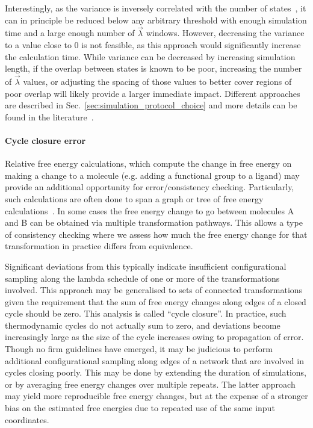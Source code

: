 \documentclass[9pt,bestpractices]{livecoms}
\begin{document}
Interestingly, as the variance is inversely correlated with the number of states~\cite{klimovich2015guidelines}, it can in principle be reduced below any arbitrary threshold with enough simulation time and a large enough number of $\vec{\lambda}$ windows. However, decreasing the variance to a value close to 0 is not feasible, as this approach would significantly increase the calculation time. While variance can be decreased by increasing simulation length, if the overlap between states is known to be poor, increasing the number of $\vec{\lambda}$ values, or adjusting the spacing of those values to better cover regions of poor overlap will likely provide a larger immediate impact. Different approaches are described in Sec.~\ref{sec:simulation_protocol_choice} and more details can be found in the literature~\cite{dakka2018concurrent, hahn2019alchemical}.

\paragraph{Cycle closure error}
Relative free energy calculations, which compute the change in free energy on making a change to a molecule (e.g. adding a functional group to a ligand) may provide an additional opportunity for error/consistency checking. Particularly, such calculations are often done to span a graph or tree of free energy calculations~\cite{xu2019optimal,wang2013modeling,liu2013lead}. In some cases the free energy change to go between molecules A and B can be obtained via multiple transformation pathways. This allows a type of consistency checking where we assess how much the free energy change for that transformation in practice differs from equivalence. 

Significant deviations from this typically indicate insufficient configurational sampling along the lambda schedule of one or more of the transformations involved. This approach may be generalised to sets of connected transformations given the requirement that the sum of free energy changes along edges of a closed cycle should be zero. This analysis is called ``cycle closure''. In practice, such thermodynamic cycles do not actually sum to zero, and deviations become increasingly large as the size of the cycle increases owing to propagation of error. Though no firm guidelines have emerged, it may be judicious to perform additional configurational sampling along edges of a network that are involved in cycles closing poorly. This may be done by extending the duration of simulations, or by averaging free energy changes over multiple repeats. The latter approach may yield more reproducible free energy changes, but at the expense of a stronger bias on the estimated free energies due to repeated use of the same input coordinates.
\end{document}
